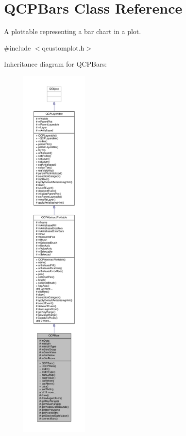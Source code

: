 \hypertarget{class_q_c_p_bars}{}\section{Q\+C\+P\+Bars Class Reference}
\label{class_q_c_p_bars}


A plottable representing a bar chart in a plot.  




{\ttfamily \#include $<$qcustomplot.\+h$>$}



Inheritance diagram for Q\+C\+P\+Bars\+:\nopagebreak
\begin{figure}[H]
\begin{center}
\leavevmode
\includegraphics[height=550pt]{class_q_c_p_bars__inherit__graph}
\end{center}
\end{figure}


